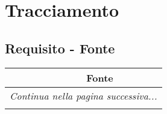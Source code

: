 \section{Tracciamento} \label{_tracciamento}

\iffalse %

\subsection{Requisito - Fonte}

\resetCR
\begin{center}
	\begin{longtable}{|c|c|}
		\hline
		\rowcolor{lighter-grayer}{ \textbf{ID Requisito} } & {\textbf{Fonte} }        \\ \hline
		\endhead
		\multicolumn{2}{|c|}{\textit{Continua nella pagina successiva...}}            \\
		\hline
		\hline
		\endfoot
		\endlastfoot


\end{longtable}
\end{center}
